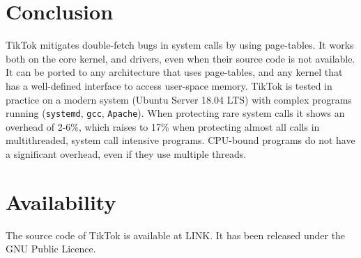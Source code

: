 \documentclass[conference]{IEEEtran}
\newcommand{\sysname}{TikTok}
\newcommand{\roughevaloverheadbad}{17\%}
\newcommand{\roughevaloverheadbetter}{2-6\%}
\begin{document}
\section{Conclusion}
\sysname{} mitigates double-fetch bugs in system calls by using page-tables. It
works both on the core kernel, and drivers, even when their source code is not
available. It can be ported to any architecture that uses page-tables, and any
kernel that has a well-defined interface to access user-space memory. \sysname{}
is tested in practice on a modern system (Ubuntu Server 18.04 LTS) with complex
programs running (\texttt{systemd}, \texttt{gcc}, \texttt{Apache}). When
protecting rare system calls it shows an overhead of \roughevaloverheadbetter{},
which raises to \roughevaloverheadbad{} when protecting almost all calls in
multithreaded, system call intensive programs. CPU-bound programs do not have a
significant overhead, even if they use multiple threads.

\section*{Availability}

The source code of TikTok is available at LINK. It has been released under the
GNU Public Licence.




\end{document}
